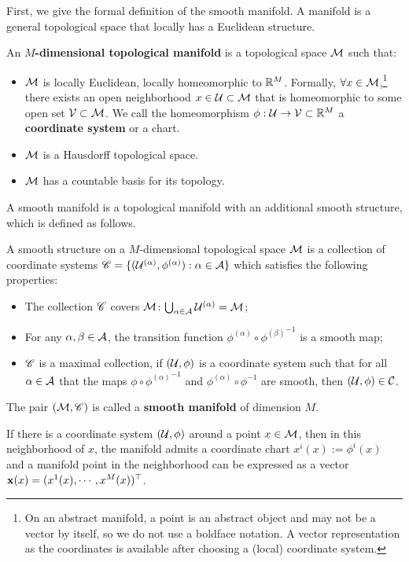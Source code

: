 First, we give the formal definition of the smooth manifold. A manifold is a general topological space that locally has a Euclidean structure.
\begin{definition}
    An \textbf{$M$-dimensional topological manifold} is a topological space $\mathcal{M}$ such that:
    \begin{itemize}
        \item $\mathcal{M}$ is locally Euclidean, \ie locally homeomorphic to $\mathbb{R}^M$. Formally, $\forall x\in\mathcal{M}$,\footnote{On an abstract manifold, a point is an abstract object and may not be a vector by itself, so we do not use a boldface notation. A vector representation as the coordinates is available after choosing a (local) coordinate system.} there exists an open neighborhood $x\in \mathcal{U}\subset\mathcal{M}$ that is homeomorphic to some open set $\mathcal{V}\subset\mathcal{M}$. We call the homeomorphism $\phi:\mathcal{U}\to \mathcal{V}\subset\mathbb{R}^M$ a \textbf{coordinate system} or a chart.
        \item $\mathcal{M}$ is a Hausdorff topological space.
        \item $\mathcal{M}$ has a countable basis for its topology.
    \end{itemize}
\end{definition}
A smooth manifold is a topological manifold with an additional smooth structure, which is defined as follows. 
\begin{definition}\label{def:smooth-manifold}
 A smooth structure on a $M$-dimensional topological space $\mathcal{M}$ is a collection of coordinate systems $\mathscr{C}=\{(\mathcal{U}^{(\alpha)},\phi^{(\alpha)}):\alpha\in \mathcal{A}\}$ which satisfies the following properties:
 \begin{itemize}
     \item The collection $\mathscr{C}$ covers $\mathcal{M}$: $\bigcup_{\alpha \in \mathcal{A}}\mathcal{U}^{(\alpha)}=\mathcal{M}$;
     \item For any $\alpha,\beta \in \mathcal{A}$, the transition function $\phi^{(\alpha)}\circ{\phi^{(\beta)}}^{-1}$ is a smooth map;
     \item $\mathscr{C}$ is a maximal collection, \ie if $(\mathcal{U},\phi)$ is a coordinate system such that for all $\alpha\in \mathcal{A}$ that the maps $\phi\circ{\phi^{(\alpha)}}^{-1}$ and $\phi^{(\alpha)}\circ\phi^{-1}$ are smooth, then $(\mathcal{U},\phi)\in\mathcal{C}$.
 \end{itemize}
 The pair $(\mathcal{M},\mathscr{C})$ is called a \textbf{smooth manifold} of dimension $M$.
\end{definition}
If there is a coordinate system $(\mathcal{U}, \phi)$ around a point $x \in \mathcal{M}$, then in this neighborhood of $x$, the manifold admits a coordinate chart $x^i(x) := \phi^i(x)$ and a manifold point in the neighborhood can be expressed as a vector $\mathbf{x}(x) = (x^1(x), \cdots, x^M(x))^{\top}$.

